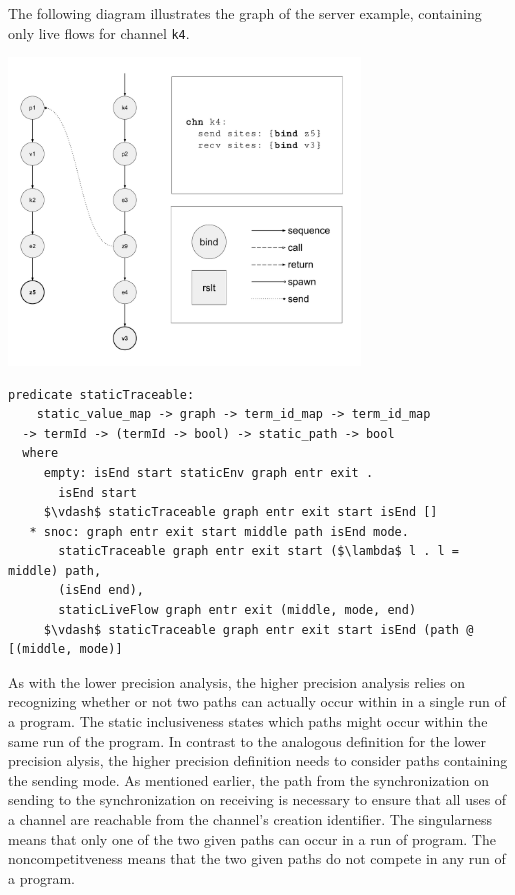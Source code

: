 \documentclass[letterpaper, 11pt]{extarticle}
\begin{document}
The following diagram illustrates the graph of the server example,
containing only live flows for channel \lstinline{k4}. \

\includegraphics[width=0.7\textwidth]{cml-graph-k4.pdf}

\begin{lstlisting}[language=logic, mathescape]
  predicate staticTraceable:
    static_value_map -> graph -> term_id_map -> term_id_map
  -> termId -> (termId -> bool) -> static_path -> bool
  where
     empty: isEnd start staticEnv graph entr exit .
       isEnd start
     $\vdash$ staticTraceable graph entr exit start isEnd []
   * snoc: graph entr exit start middle path isEnd mode. 
       staticTraceable graph entr exit start ($\lambda$ l . l = middle) path, 
       (isEnd end),
       staticLiveFlow graph entr exit (middle, mode, end) 
     $\vdash$ staticTraceable graph entr exit start isEnd (path @ [(middle, mode)]
\end{lstlisting}

As with the lower precision analysis, the higher precision analysis relies on recognizing
whether or not two paths can actually occur within in a single run of a program. The static
inclusiveness states which paths might occur within the same run of the program.
In contrast to the analogous definition for the lower precision
alysis, the higher precision definition needs to consider paths containing the
sending mode. As mentioned earlier, the path from the synchronization on sending to the
synchronization on receiving is necessary to ensure that all uses of a channel are reachable
from the channel's creation identifier. The singularness means that only one of the two
given paths can occur in a run of program. The noncompetitveness means that the two
given paths do not compete in any run of a program. 
\end{document}
